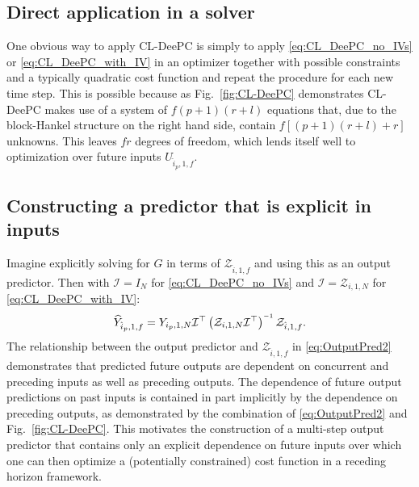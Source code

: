 %
\subsection{Direct application in a solver}
One obvious way to apply \ac{CL-DeePC} is simply to apply \eqref{eq:CL_DeePC_no_IVs} or \eqref{eq:CL_DeePC_with_IV} in an optimizer together with possible constraints and a typically quadratic cost function and repeat the procedure for each new time step. This is possible because as Fig.~\ref{fig:CL-DeePC} demonstrates \ac{CL-DeePC} makes use of a system of $f(p+1)(r+l)$ equations that, due to the block-Hankel structure on the right hand side, contain $f[(p+1)(r+l)+r]$ unknowns. %
This leaves $fr$ degrees of freedom, which lends itself well to optimization over future inputs $U_{\hat{i}_p,1,f}$.
%
\subsection{Constructing a predictor that is explicit in inputs}
Imagine explicitly solving for $G$ in terms of $\mathcal{Z}_{\hat{i},1,f}$ and using this as an output predictor. Then with $\mathcal{I}=I_N$ for \eqref{eq:CL_DeePC_no_IVs} and $\mathcal{I}=\mathcal{Z}_{i,1,N}$ for \eqref{eq:CL_DeePC_with_IV}:
\begin{align}\label{eq:OutputPred2}
     \widehat{Y}_{\hat{i}_p,1,f} = Y_{i_p,1,N}{\mathcal{I}}^\top \left(\mathcal{Z}_{i,1,N}{\mathcal{I}}^\top\right)\inv\mathcal{Z}_{\hat{i},1,f}.
\end{align}
The relationship between the output predictor and $\mathcal{Z}_{\hat{i},1,f}$ in \eqref{eq:OutputPred2} demonstrates that predicted future outputs are dependent on concurrent and preceding inputs as well as preceding outputs. The dependence of future output predictions on past inputs is contained in part implicitly by the dependence on preceding outputs, as demonstrated by the combination of \eqref{eq:OutputPred2} and Fig.~\ref{fig:CL-DeePC}. This motivates the construction of a multi-step output predictor that contains only an explicit dependence on future inputs over which one can then optimize a (potentially constrained) cost function in a receding horizon framework.
